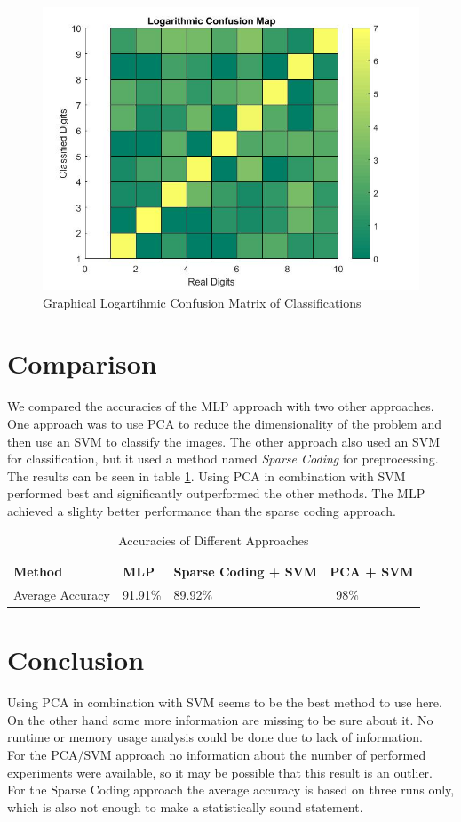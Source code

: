 \documentclass[paper=a4, fontsize=11pt]{scrartcl} %
\numberwithin{equation}{section} %
\numberwithin{figure}{section} %
\numberwithin{table}{section} %
\begin{document}
\begin{figure}[H]
	\centering
	\includegraphics[width = 0.6\linewidth]{./logConfusion.jpg}
	\caption{Graphical Logartihmic Confusion Matrix of Classifications}
	\label{fig:log_confusion}
\end{figure}

\section{Comparison}
We compared the accuracies of the MLP approach with two other approaches. One approach was to use PCA to reduce the dimensionality of the problem and then use an SVM to classify the images. The other approach also used an SVM for classification, but it used a method named \textit{Sparse Coding} for preprocessing.\\
The results can be seen in table \ref{tab:comparison}.
Using PCA in combination with SVM performed best and significantly outperformed the other methods.
The MLP achieved a slighty better performance than the sparse coding approach.


\begin{table}[H]
\centering
\caption{Accuracies of Different Approaches}
\label{tab:comparison}
\begin{tabular}{l|lll}
Method & MLP & Sparse Coding + SVM & PCA + SVM \\ \hline
Average Accuracy & 91.91\% & 89.92\% & ~98\%
\end{tabular}
\end{table}

\section{Conclusion}
Using PCA in combination with SVM seems to be the best method to use here. On the other hand some more information are missing to be sure about it. No runtime or memory usage analysis could be done due to lack of information.\\
For the PCA/SVM approach no information about the number of performed experiments were available, so it may be possible that this result is an outlier. For the Sparse Coding approach the average accuracy is based on three runs only, which is also not enough to make a statistically sound statement.
\end{document}
